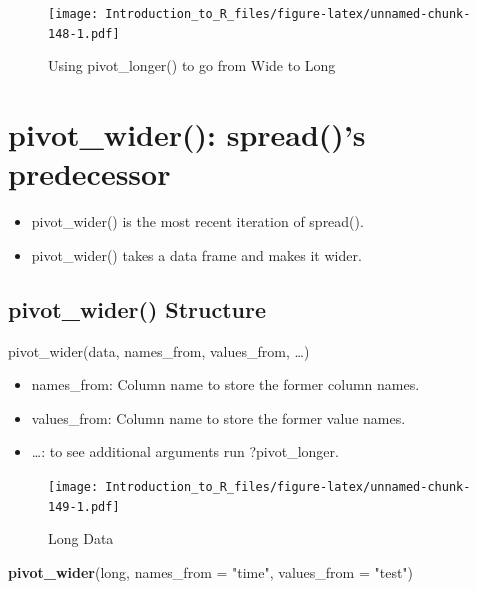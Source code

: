 \documentclass[]{book}
\newenvironment{Shaded}{\begin{snugshade}}{\end{snugshade}}
\newcommand{\DataTypeTok}[1]{\textcolor[rgb]{0.13,0.29,0.53}{#1}}
\newcommand{\KeywordTok}[1]{\textcolor[rgb]{0.13,0.29,0.53}{\textbf{#1}}}
\newcommand{\NormalTok}[1]{#1}
\newcommand{\StringTok}[1]{\textcolor[rgb]{0.31,0.60,0.02}{#1}}
\providecommand{\tightlist}{%
  \setlength{\itemsep}{0pt}\setlength{\parskip}{0pt}}
\theoremstyle{definition}
\theoremstyle{definition}
\theoremstyle{definition}
\theoremstyle{remark}
\let\BeginKnitrBlock\begin \let\EndKnitrBlock\end
\begin{document}
\begin{figure}
\centering
\texttt{[image: Introduction\_to\_R\_files/figure-latex/unnamed-chunk-148-1.pdf]}
\caption{\label{fig:unnamed-chunk-148}Using pivot\_longer() to go from Wide to Long}
\end{figure}

\hypertarget{pivot_wider-spreads-predecessor}{%
\section{pivot\_wider(): spread()'s predecessor}\label{pivot_wider-spreads-predecessor}}

\begin{itemize}
\tightlist
\item
  pivot\_wider() is the most recent iteration of spread().
\item
  pivot\_wider() takes a data frame and makes it wider.
\end{itemize}

\hypertarget{pivot_wider-structure}{%
\subsection{pivot\_wider() Structure}\label{pivot_wider-structure}}

pivot\_wider(data, names\_from, values\_from, \ldots{})

\begin{itemize}
\tightlist
\item
  names\_from: Column name to store the former column names.
\item
  values\_from: Column name to store the former value names.
\item
  \ldots{}: to see additional arguments run ?pivot\_longer.
\end{itemize}

\begin{figure}
\centering
\texttt{[image: Introduction\_to\_R\_files/figure-latex/unnamed-chunk-149-1.pdf]}
\caption{\label{fig:unnamed-chunk-149}Long Data}
\end{figure}

\BeginKnitrBlock{example}
\protect\hypertarget{exm:spread1}{}{\label{exm:spread1} }
\EndKnitrBlock{example}

\begin{Shaded}
\begin{Highlighting}[]
\KeywordTok{pivot_wider}\NormalTok{(long, }\DataTypeTok{names_from =}  \StringTok{"time"}\NormalTok{, }\DataTypeTok{values_from =} \StringTok{"test"}\NormalTok{)}
\end{Highlighting}
\end{Shaded}
\end{document}
